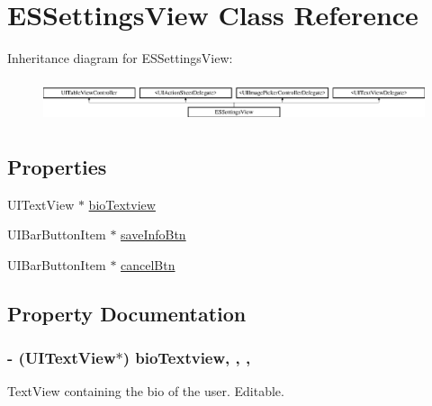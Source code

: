 \hypertarget{interface_e_s_settings_view}{}\section{E\+S\+Settings\+View Class Reference}
\label{interface_e_s_settings_view}
Inheritance diagram for E\+S\+Settings\+View\+:\begin{figure}[H]
\begin{center}
\leavevmode
\includegraphics[height=1.272727cm]{interface_e_s_settings_view}
\end{center}
\end{figure}
\subsection*{Properties}
\begin{DoxyCompactItemize}
\item 
U\+I\+Text\+View $\ast$ \hyperlink{interface_e_s_settings_view_ae6ab756b846df2b0467b73f867a86907}{bio\+Textview}
\item 
U\+I\+Bar\+Button\+Item $\ast$ \hyperlink{interface_e_s_settings_view_a0f3b7fa2f2d2b97a0ef7b4cec79e4f08}{save\+Info\+Btn}
\item 
U\+I\+Bar\+Button\+Item $\ast$ \hyperlink{interface_e_s_settings_view_a684344b5479173cd17a840aa208f556f}{cancel\+Btn}
\end{DoxyCompactItemize}


\subsection{Property Documentation}
\hypertarget{interface_e_s_settings_view_ae6ab756b846df2b0467b73f867a86907}{}
\subsubsection[{bio\+Textview}]{\setlength{\rightskip}{0pt plus 5cm}-\/ (U\+I\+Text\+View$\ast$) bio\+Textview\hspace{0.3cm}{\ttfamily [read]}, {\ttfamily [write]}, {\ttfamily [nonatomic]}, {\ttfamily [strong]}}\label{interface_e_s_settings_view_ae6ab756b846df2b0467b73f867a86907}
Text\+View containing the bio of the user. Editable. \hypertarget{interface_e_s_settings_view_a684344b5479173cd17a840aa208f556f}{}

